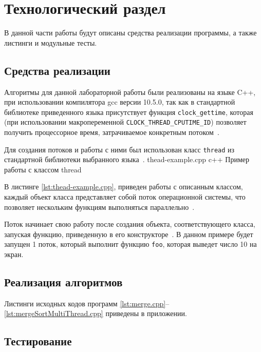 \chapter{Технологический раздел}

В данной части работы будут описаны средства реализации программы, а также листинги и  модульные  тесты.

\section{Средства реализации}
Алгоритмы для данной лабораторной работы были реализованы на языке C++, при использовании компилятора gcc версии 10.5.0, так как в стандартной библиотеке приведенного языка
присутствует функция \texttt{clock\_gettime}, которая (при использовании макропеременной \texttt{CLOCK\_THREAD\_CPUTIME\_ID}) позволяет получить процессорное время, затрачиваемое конкретным потоком~\cite{cpp-time}.

Для создания потоков и работы с ними был использован класс \texttt{thread} из стандартной библиотеки выбранного языка~\cite{std-thread}.
{thead-example.cpp} %
{c++} %
{Пример работы с классом thread} %

В листинге \ref{lst:thead-example.cpp}, приведен работы с описанным классом, каждый объект класса представляет собой поток операционной системы, что позволяет нескольким функциям выполняться параллельно~\cite{std-thread}. 

Поток начинает свою работу после создания объекта, соответствующего класса, запуская функцию, приведенную в его конструкторе~\cite{std-thread}.
В данном примере будет запущен 1 поток, который выполнит функцию \texttt{foo},
которая выведет число 10 на экран.


\section{Реализация алгоритмов}
Листинги исходных кодов программ  \ref{lst:merge.cpp}--\ref{lst:mergeSortMultiThread.cpp} приведены в приложении. 

\section{Тестирование}

